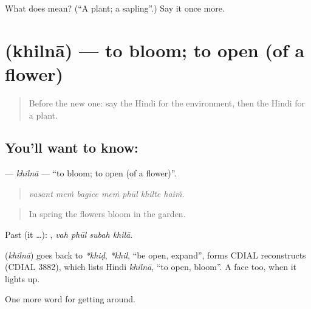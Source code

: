 \begin{tcolorbox}[breakable,colback=teal!4,colframe=teal!35!black,title={Before you move on}]
What does  mean? (\textquotedblleft{}A plant; a sapling\textquotedblright{}.) Say it once more.
\end{tcolorbox}
\section[\texorpdfstring{\hi{खिलना} (khilnā)}{खिलना (khilnā)}]{ (khilnā) — to bloom; to open (of a flower)}

\label{lesson:HI-C446-khilna}



\begin{quote}
Before the new one: say the Hindi for the environment, then the Hindi for a plant.
\end{quote}

\subsection*{You'll want to know: }
\textbf{} — \emph{khilnā} — \textquotedblleft{}to bloom; to open (of a flower)\textquotedblright{}.

\begin{quote}
      
\end{quote}

\begin{quote}
\emph{vasant meṁ bagīce meṁ phūl khilte haiṁ.}
\end{quote}

\begin{quote}
In spring the flowers bloom in the garden.
\end{quote}

Past (it …):    , \emph{vah phūl subah khilā}.

\begin{cousinweb}
\textbf{} (\emph{khilnā}) goes back to \emph{*khiḍ}, \emph{*khil}, \textquotedblleft{}be open, expand\textquotedblright{}, forms CDIAL reconstructs (CDIAL 3882), which lists Hindi \emph{khilnā}, \textquotedblleft{}to open, bloom\textquotedblright{}. A face  too, when it lights up.
\end{cousinweb}

\begin{grammarlens}[title={What you've built}]
One more word for getting around.
\end{grammarlens}


